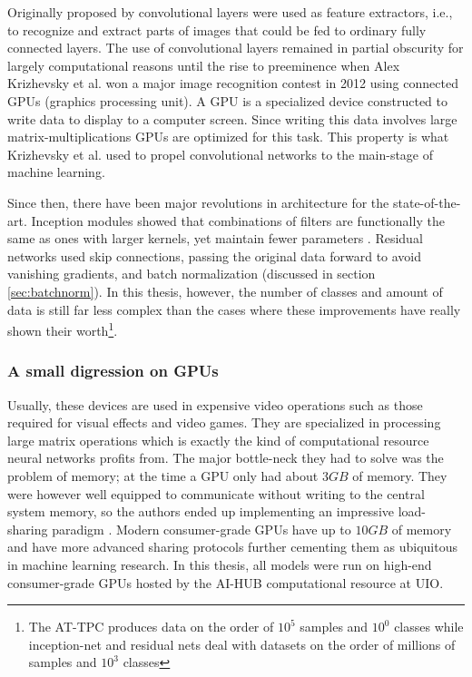 Originally proposed by \citet{Lecun1998} convolutional layers were used as feature extractors, i.e., to recognize and extract parts of images that could be fed to ordinary fully connected layers. The use of convolutional layers remained in partial obscurity for largely computational reasons until the rise to preeminence when Alex Krizhevsky et al. won a major image recognition contest in 2012 using connected GPUs (graphics processing unit)\cite{Krizhevsky2012}. A GPU is a specialized device constructed to write data to display to a computer screen. Since writing this data involves large matrix-multiplications GPUs are optimized for this task. This property is what Krizhevsky et al. used to propel convolutional networks to the main-stage of machine learning.

Since then, there have been major revolutions in architecture for the state-of-the-art. Inception modules showed that combinations of filters are functionally the same as ones with larger kernels, yet maintain fewer parameters \cite{Szegedy2014}. Residual networks used skip connections, passing the original data forward to avoid vanishing gradients, and batch normalization (discussed in section \ref{sec:batchnorm}). In this thesis, however, the number of classes and amount of data is still far less complex than the cases where these improvements have really shown their worth\footnote{The AT-TPC produces data on the order of $10^5$ samples and $10^0$ classes while inception-net and residual nets deal with datasets on the order of millions of samples and $10^3$ classes}.

\subsubsection{A small digression on GPUs}
Usually, these devices are used in expensive video operations such as those required for visual effects and video games. They are specialized in processing large matrix operations which is exactly the kind of computational resource neural networks profits from. The major bottle-neck they had to solve was the problem of memory; at the time a GPU only had about $3 GB$ of memory. They were however well equipped to communicate without writing to the central system memory, so the authors ended up implementing an impressive load-sharing paradigm \cite{Krizhevsky2012}. Modern consumer-grade GPUs have up to $10 GB$ of memory and have more advanced sharing protocols further cementing them as ubiquitous in machine learning research. In this thesis, all models were run on high-end consumer-grade GPUs hosted by the AI-HUB computational resource at UIO.
